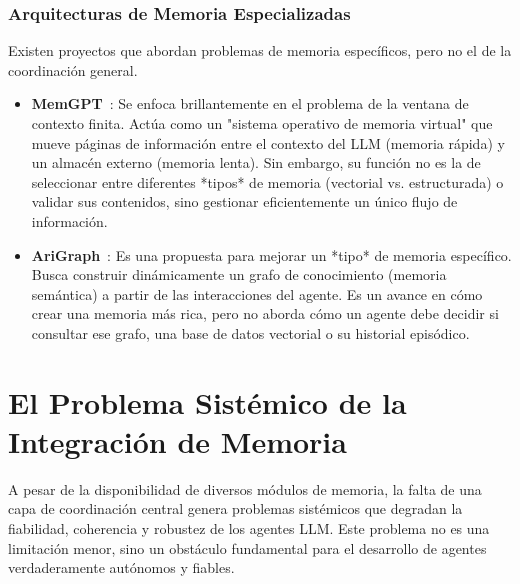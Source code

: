 \documentclass[conference]{IEEEtran}
\begin{document}
\subsubsection{Arquitecturas de Memoria Especializadas}
Existen proyectos que abordan problemas de memoria específicos, pero no el de la coordinación general.
\begin{itemize}
    \item \textbf{MemGPT}~\cite{packer2023memgpt}: Se enfoca brillantemente en el problema de la ventana de contexto finita. Actúa como un "sistema operativo de memoria virtual" que mueve páginas de información entre el contexto del LLM (memoria rápida) y un almacén externo (memoria lenta). Sin embargo, su función no es la de seleccionar entre diferentes *tipos* de memoria (vectorial vs. estructurada) o validar sus contenidos, sino gestionar eficientemente un único flujo de información.
    \item \textbf{AriGraph}~\cite{anokhin2024arigraph}: Es una propuesta para mejorar un *tipo* de memoria específico. Busca construir dinámicamente un grafo de conocimiento (memoria semántica) a partir de las interacciones del agente. Es un avance en cómo crear una memoria más rica, pero no aborda cómo un agente debe decidir si consultar ese grafo, una base de datos vectorial o su historial episódico.
\end{itemize}

\section{El Problema Sistémico de la Integración de Memoria}

A pesar de la disponibilidad de diversos módulos de memoria, la falta de una capa de coordinación central genera problemas sistémicos que degradan la fiabilidad, coherencia y robustez de los agentes LLM. Este problema no es una limitación menor, sino un obstáculo fundamental para el desarrollo de agentes verdaderamente autónomos y fiables.
\end{document}
